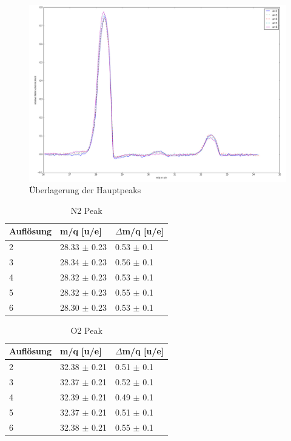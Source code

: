 \documentclass[10pt,a4paper]{article}
\begin{document}
\begin{figure}[h]
	\includegraphics[scale = 0.5]{zweipeaks.png}
	\centering
	\caption{Überlagerung der Hauptpeaks}
	\label{f4}
\end{figure}
\begin{table}[k]
	\centering
	\caption{N2 Peak}
	\label{t1}
	\begin{tabular}{|l|l|l|}
		\hline
		Auflösung & m/q {[}u/e{]} & $\Delta$m/q {[}u/e{]} \\ \hline
		2         & 28.33 $\pm$ 0.23        & 0.53 $\pm$ 0.1                 \\ \hline
		3         & 28.34 $\pm$ 0.23        & 0.56 $\pm$ 0.1                 \\ \hline
		4         & 28.32 $\pm$ 0.23        & 0.53 $\pm$ 0.1                 \\ \hline
		5         & 28.32 $\pm$ 0.23        & 0.55 $\pm$ 0.1                 \\ \hline
		6         & 28.30 $\pm$ 0.23        & 0.53 $\pm$ 0.1                 \\ \hline
	\end{tabular}
\end{table}
\begin{table}[k]
	\centering
	\caption{O2 Peak}
	\label{t2}
	\begin{tabular}{|l|l|l|}
		\hline
		Auflösung & m/q {[}u/e{]} & $\Delta$m/q {[}u/e{]} \\ \hline
		2         & 32.38 $\pm$ 0.21         & 0.51 $\pm$ 0.1                 \\ \hline
		3         & 32.37 $\pm$ 0.21         & 0.52 $\pm$ 0.1                 \\ \hline
		4         & 32.39 $\pm$ 0.21         & 0.49 $\pm$ 0.1                 \\ \hline
		5         & 32.37 $\pm$ 0.21         & 0.51 $\pm$ 0.1                 \\ \hline
		6         & 32.38 $\pm$ 0.21         & 0.55 $\pm$ 0.1                 \\ \hline
	\end{tabular}
\end{table}
\end{document}
